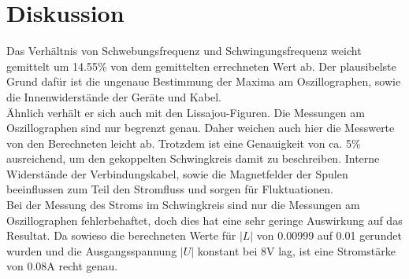 \section{Diskussion}
\label{sec:Diskussion}

Das Verhältnis von Schwebungsfrequenz und Schwingungsfrequenz weicht gemittelt um 14.55\% von dem gemittelten errechneten Wert ab.
Der plausibelste Grund dafür ist die ungenaue Bestimmung der Maxima am Oszillographen, sowie die Innenwiderstände der Geräte und Kabel.
\\
Ähnlich verhält er sich auch mit den Lissajou-Figuren. Die Messungen am Oszillographen sind nur begrenzt genau.
Daher weichen auch hier die Messwerte von den Berechneten leicht ab. 
Trotzdem ist eine Genauigkeit von ca. 5\% ausreichend, um den gekoppelten Schwingkreis damit zu beschreiben.
Interne Widerstände der Verbindungskabel, sowie die Magnetfelder der Spulen beeinflussen zum Teil den Stromfluss und sorgen für Fluktuationen.
\\
Bei der Messung des Stroms im Schwingkreis sind nur die Messungen am Oszillographen fehlerbehaftet, doch dies hat eine sehr geringe Auswirkung auf das Resultat.
Da sowieso die berechneten Werte für \(|L|\) von 0.00999 auf 0.01 gerundet wurden und die Ausgangsspannung \(|U|\) konstant bei 8V lag, ist eine Stromstärke von 0.08A recht genau.

